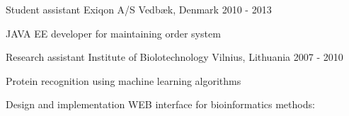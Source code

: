 \begin{cventries}
  \cventry
    {Student assistant} %
    {Exiqon A/S} %
    {Vedbæk, Denmark} %
    {2010 - 2013} %
    {
      \begin{cvitems} %
        \item {JAVA EE developer for maintaining order system}
      \end{cvitems}
    }

  \cventry
    {Research assistant} %
    {Institute of Biolotechnology} %
    {Vilnius, Lithuania} %
    {2007 - 2010} %
    {
      \begin{cvitems} %
        \item {Protein recognition using machine learning algorithms}
        \item {Design and implementation WEB interface for bioinformatics methods:}
      \end{cvitems}
    }

\end{cventries}

